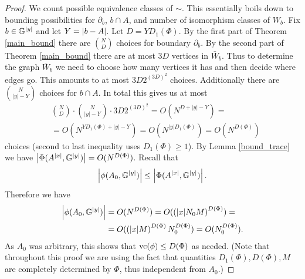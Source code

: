 \begin{proof}
  We count possible equivalence classes of $\sim$.
  This essentially boils down to bounding possibilities for $\partial_b$, $b \cap A$, and number of isomorphism classes of $W_b$.
  Fix $b \in \mathbb G^{|y|}$ and let $Y = \left|b - A\right|$.
  Let $D = Y D_1(\Phi)$.
  By the first part of Theorem \ref{main_bound} there are $N \choose D$ choices for boundary $\partial_b$.
  By the second part of Theorem \ref{main_bound} there are at most $3D$ vertices in $\bar W_b$.
  Thus to determine the graph $\bar W_b$ we need to choose how many vertices it has and then decide where edges go.
  This amounts to at most $3D 2^{(3D)^2}$ choices.
  Additionally there are $N \choose |y| - Y$ choices for $b \cap A$.
  In total this gives us at most
  \begin{align*}
    &{N \choose D} \cdot {N \choose |y| - Y} \cdot 3D 2^{(3D)^2} = O(N^{D + |y| - Y}) = \\
    &= O(N^{Y D_1(\Phi) + |y| - Y}) = O(N^{|y| D_1(\Phi)}) = O(N^{D(\Phi)})
  \end{align*}
  choices (second to last inequality uses $D_1(\Phi) \geq 1$).
  By Lemma \ref{bound_trace} we have $\left|\Phi(A^{|x|}, \mathbb G^{|y|})\right| = O(N^{D(\Phi)})$.
  Recall that 
  \begin{align*}
    \left|\phi(A_0, \mathbb G^{|y|})\right| \leq \left|\Phi(A^{|x|}, \mathbb G^{|y|})\right|.    
  \end{align*}
  Therefore we have
  \begin{align*}
    \left|\phi(A_0, \mathbb G^{|y|})\right| &= O(N^{D(\Phi)}) = O(\left(|x| N_0 M\right)^{D(\Phi)}) = \\
    &= O(\left(|x| M\right)^{D(\Phi)} N_0^{D(\Phi)}) = O(N_0^{D(\Phi)}).
  \end{align*}
  As $A_0$ was arbitrary, this shows that $\operatorname{vc}(\phi) \leq D(\Phi)$ as needed.
  (Note that throughout this proof we are using the fact that quantities $D_1(\Phi), D(\Phi), M$ are completely determined by $\Phi$,
  thus independent from $A_0$.)
\end{proof}

